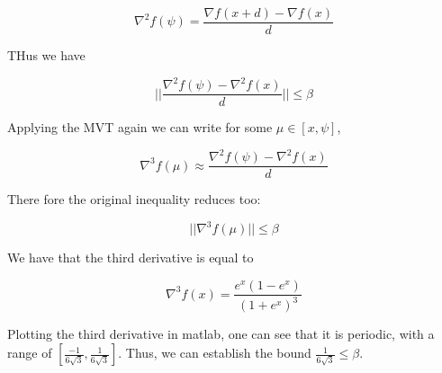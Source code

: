 \documentclass[answers]{exam} %
\begin{document}
\begin{itemize}
\begin{framed}
\[
\nabla^2 f(\psi)  = \frac{ \nabla f(x + d) - \nabla f(x)}{d}
\]

THus we have 

\[
|| \frac{\nabla^2 f(\psi) - \nabla^2 f(x)}{d} || \leq \beta
\]

Applying the MVT again we can write for some $\mu \in [x, \psi]$, 

\[
\nabla^3 f( \mu) \approx \frac{\nabla^2 f(\psi) - \nabla^2 f(x)}{d}
\]

There fore the original inequality reduces too:

\[
|| \nabla^3 f(\mu) || \leq \beta
\]

We have that the third derivative is equal to

\[
\nabla^3 f(x) = \frac{e^{x}( 1- e^{x})}{( 1 + e^{x})^3}
\]

Plotting the third derivative in matlab, one can see that it is periodic, with a range of $[\frac{-1}{6 \sqrt{3}}, \frac{1}{6 \sqrt{3}}]$. Thus, we can establish the bound $  \frac{1}{6 \sqrt{3}} \leq \beta$. 








\end{framed}
\end{itemize}
\end{document}

